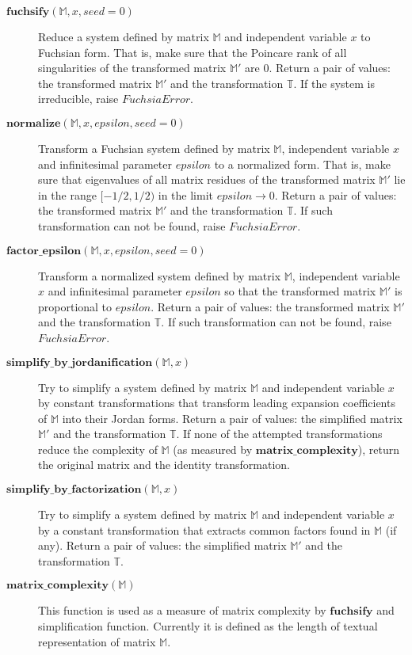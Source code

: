 \documentclass[12pt,a4paper]{article}
\def\F#1{\mathbf{#1}} %
\def\M#1{\mathbb{#1}} %
\def\functionitem#1#2{\item[$\F{#1}(#2)$]}
\begin{document}
\begin{description}

\functionitem{fuchsify}{\M M, x, seed=0}
Reduce a system defined by matrix $\M M$ and independent variable
$x$ to Fuchsian form. That is, make sure that the Poincare rank
of all singularities of the transformed matrix $\M M'$ are
$0$. Return a pair of values: the transformed matrix $\M M'$
and the transformation $\M T$. If the system is irreducible,
raise $FuchsiaError$.

\functionitem{normalize}{\M M, x, epsilon, seed=0}
Transform a Fuchsian system defined by matrix $\M M$, independent
variable $x$ and infinitesimal parameter $epsilon$ to a normalized
form. That is, make sure that eigenvalues of all matrix residues
of the transformed matrix $\M M'$ lie in the range $[-1/2, 1/2)$
in the limit $epsilon\to0$. Return a pair of values: the
transformed matrix $\M M'$ and the transformation $\M T$. If
such transformation can not be found, raise $FuchsiaError$.

\functionitem{factor\_epsilon}{\M M, x, epsilon, seed=0}
Transform a normalized system defined by matrix $\M M$, independent
variable $x$ and infinitesimal parameter $epsilon$ so that the
transformed matrix $\M M'$ is proportional to $epsilon$. Return a
pair of values: the transformed matrix $\M M'$ and the transformation
$\M T$. If such transformation can not be found, raise $FuchsiaError$.

\functionitem{simplify\_by\_jordanification}{\M M, x}
Try to simplify a system defined by matrix $\M M$ and independent
variable $x$ by constant transformations that transform leading
expansion coefficients of $\M M$ into their Jordan forms. Return a
pair of values: the simplified matrix $\M M'$ and the transformation
$\M T$. If none of the attempted transformations reduce the
complexity of $\M M$ (as measured by $\F{matrix\_complexity}$),
return the original matrix and the identity transformation.

\functionitem{simplify\_by\_factorization}{\M M, x}
Try to simplify a system defined by matrix $\M M$ and independent
variable $x$ by a constant transformation that extracts common
factors found in $\M M$ (if any). Return a pair of values:
the simplified matrix $\M M'$ and the transformation $\M T$.

\functionitem{matrix\_complexity}{\M M}
This function is used as a measure of matrix complexity by
$\F{fuchsify}$ and simplification function. Currently it is
defined as the length of textual representation of matrix $\M M$.


\end{description}
\end{document}
